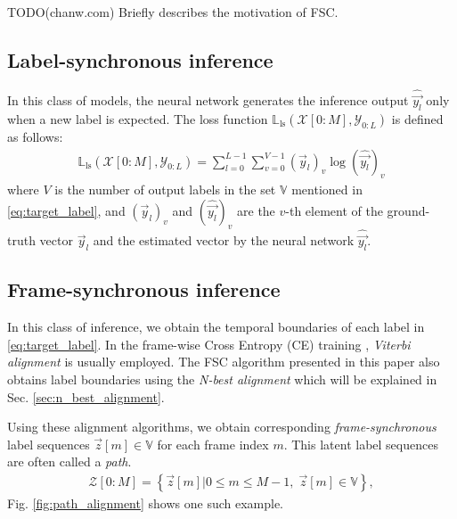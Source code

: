 \documentclass{article}
\begin{document}
TODO(chanw.com) Briefly describes the motivation of FSC.



\subsection{Label-synchronous inference}
In this class of models, the neural network generates the inference output 
$\widehat{\vec{y_l}}$ 
only when a new label is expected. The loss function 
$\mathbb{L}_{\text{ls}}\left(\mathcal{X}[0:M], \mathcal{Y}_{0:L}\right)$ is 
defined as follows:
   \begin{align}
     \mathbb{L}_{\text{ls}}\left(\mathcal{X}[0:M], 
        \mathcal{Y}_{0:L}\right) 
        = \sum_{l=0}^{L-1} 
          \sum_{v=0}^{V-1}
          \left(\vec{y}_l\right)_v  \log ( 
             \widehat{\vec{y_l}} )_{v}
          \label{eq:label_synchronous_ce_loss} 
   \end{align}
where $V$ is the number of output labels in the set $\mathbb{V}$ 
mentioned in \eqref{eq:target_label}, and ${(\vec{y}_l)}_v$  
and ${(\widehat{\vec{y_l}})}_{v}$ are the $v$-th element of the 
ground-truth vector $\vec{y}_l$ and the estimated vector by the 
neural network ${\widehat{\vec{y_l}}}$.


\subsection{Frame-synchronous inference}
\label{sec:frame_synchronous_inference}
In this class of inference,  we obtain
the temporal boundaries of each label in \eqref{eq:target_label}.
In the frame-wise Cross Entropy (CE) training 
\cite{g_hinton_ieee_signal_processing_mag_2012_00, 
C_Kim_INTERSPEECH_2017_1, 
B_Li_INTERSPEECH_2017_1}, {\it Viterbi alignment}  
\cite{
x_huang_prentice_hall_2001_00,
l_r_rabiner_proceedings_of_ieee_1989_00} is usually employed. 
The FSC algorithm presented in this paper also obtains
label boundaries using the {\it N-best alignment} which will
be explained in Sec. \ref{sec:n_best_alignment}.

Using these alignment algorithms, 
we obtain corresponding {\it frame-synchronous} label sequences 
$\vec{z}[m] \in \mathbb{V}$ for each frame index $m$. This
latent label sequences are often called a {\it path}.
  \begin{align}
    \mathcal{Z}[0:M]  =  
      \left\{\vec{z}[m]  \Big| 0 \le m \le M-1, \; \vec{z}[m] \in \mathbb{V} \right\}, 
    \label{eq:latent_label_seq}
  \end{align}
Fig. \ref{fig:path_alignment} shows one such example. 
\end{document}
